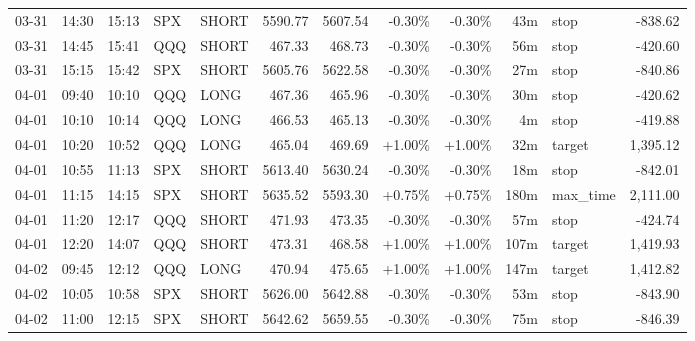 \documentclass[11pt,a4paper,twoside]{article}
\begin{document}
\begin{center}
\begin{longtable}{>{\color{txtmain}}l l l l l r r r r r >{\color{txtmain}}l r}
03-31 & 14:30 & 15:13 & SPX & SHORT & 5590.77 & 5607.54 & \textcolor{lossred}{-0.30\%} & \textcolor{lossred}{-0.30\%} & 43m & stop & \textcolor{lossred}{-838.62} \\
03-31 & 14:45 & 15:41 & QQQ & SHORT & 467.33 & 468.73 & \textcolor{lossred}{-0.30\%} & \textcolor{lossred}{-0.30\%} & 56m & stop & \textcolor{lossred}{-420.60} \\
03-31 & 15:15 & 15:42 & SPX & SHORT & 5605.76 & 5622.58 & \textcolor{lossred}{-0.30\%} & \textcolor{lossred}{-0.30\%} & 27m & stop & \textcolor{lossred}{-840.86} \\
04-01 & 09:40 & 10:10 & QQQ & LONG & 467.36 & 465.96 & \textcolor{lossred}{-0.30\%} & \textcolor{lossred}{-0.30\%} & 30m & stop & \textcolor{lossred}{-420.62} \\
04-01 & 10:10 & 10:14 & QQQ & LONG & 466.53 & 465.13 & \textcolor{lossred}{-0.30\%} & \textcolor{lossred}{-0.30\%} & 4m & stop & \textcolor{lossred}{-419.88} \\
04-01 & 10:20 & 10:52 & QQQ & LONG & 465.04 & 469.69 & \textcolor{wingreen}{+1.00\%} & \textcolor{wingreen}{+1.00\%} & 32m & target & \textcolor{wingreen}{1,395.12} \\
04-01 & 10:55 & 11:13 & SPX & SHORT & 5613.40 & 5630.24 & \textcolor{lossred}{-0.30\%} & \textcolor{lossred}{-0.30\%} & 18m & stop & \textcolor{lossred}{-842.01} \\
04-01 & 11:15 & 14:15 & SPX & SHORT & 5635.52 & 5593.30 & \textcolor{wingreen}{+0.75\%} & \textcolor{wingreen}{+0.75\%} & 180m & max\_time & \textcolor{wingreen}{2,111.00} \\
04-01 & 11:20 & 12:17 & QQQ & SHORT & 471.93 & 473.35 & \textcolor{lossred}{-0.30\%} & \textcolor{lossred}{-0.30\%} & 57m & stop & \textcolor{lossred}{-424.74} \\
04-01 & 12:20 & 14:07 & QQQ & SHORT & 473.31 & 468.58 & \textcolor{wingreen}{+1.00\%} & \textcolor{wingreen}{+1.00\%} & 107m & target & \textcolor{wingreen}{1,419.93} \\
04-02 & 09:45 & 12:12 & QQQ & LONG & 470.94 & 475.65 & \textcolor{wingreen}{+1.00\%} & \textcolor{wingreen}{+1.00\%} & 147m & target & \textcolor{wingreen}{1,412.82} \\
04-02 & 10:05 & 10:58 & SPX & SHORT & 5626.00 & 5642.88 & \textcolor{lossred}{-0.30\%} & \textcolor{lossred}{-0.30\%} & 53m & stop & \textcolor{lossred}{-843.90} \\
04-02 & 11:00 & 12:15 & SPX & SHORT & 5642.62 & 5659.55 & \textcolor{lossred}{-0.30\%} & \textcolor{lossred}{-0.30\%} & 75m & stop & \textcolor{lossred}{-846.39} \\

\end{longtable}
\end{center}
\end{document}
